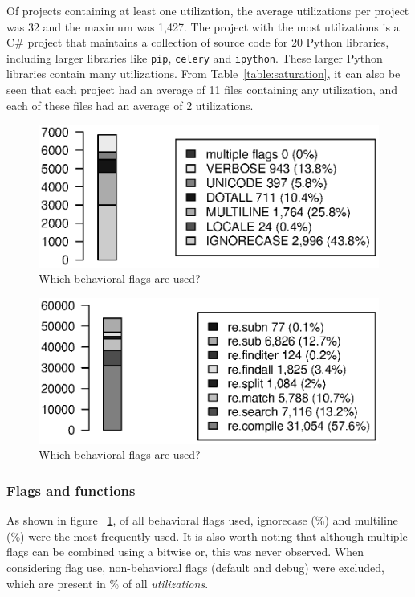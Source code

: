 Of projects containing at least one utilization, the average utilizations per project was 32 and the maximum  was 1,427.  The project with the most utilizations is a C\# project that maintains a collection of source code for 20 Python libraries, including larger libraries like {\tt pip}, {\tt celery} and {\tt ipython}.  These larger Python libraries contain many utilizations.
From Table~\ref{table:saturation}, it can also be seen that each project had an average of 11 files containing any utilization, and each of these files had an average of 2 utilizations.

\begin{figure}
\centering
  \centering
  \includegraphics[width=.72\textwidth]{nontex/illustrations/partFlags.eps}
  \caption{Which behavioral flags are used?}
  \vspace{-6pt}
\label{fig:partFlags}
\end{figure}

\begin{figure}
\centering
  \centering
  \includegraphics[width=.70\textwidth]{nontex/illustrations/partFunctions.eps}
  \caption{Which behavioral flags are used?}
  \vspace{-6pt}
\label{fig:partFunctions}
\end{figure}

\subsubsection{Flags and functions}
As shown in figure ~\ref{fig:partFlags}, of all behavioral flags used, ignorecase (\%) and multiline (\%) were the most frequently used.  It is also worth noting that although multiple flags can be combined using a bitwise or, this was never observed.
When considering flag use, non-behavioral flags (default and debug) were excluded, which are present in \% of all \emph{utilizations}.

